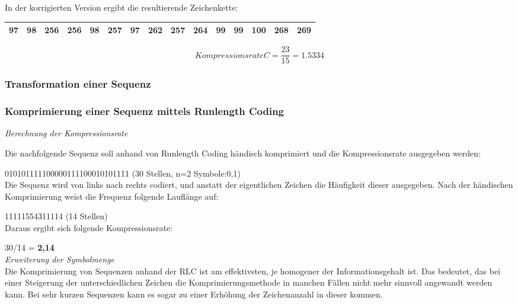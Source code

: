 \documentclass[12pt,german]{article}
\begin{document}
In der korrigierten Version ergibt die resultierende Zeichenkette: 

\begin{table}[H]
  \centering
  \begin{tabular}{| c | c | c | c | c | c | c | c | c | c | c | c | c | c | c |}
    \hline
    97 & 98& 256 & 256 & 98 & 257 & 97 & 262 & 257 & 264 & 99 & 99 & 100 & 268 & 269 \\
    \hline
  \end{tabular}
\end{table}


\begin{equation}[H]
 Kompressionsrate C = \frac{23}{15} = 1.5334	
\end{equation}


\subsubsection{Transformation einer Sequenz}

\subsubsection{Komprimierung einer Sequenz mittels Runlength Coding}
\textit{Berechnung der Kompressionsrate} 

Die nachfolgende Sequenz soll anhand von Runlength Coding händisch komprimiert und die Kompressionsrate ausgegeben werden:

010101111100000111100010101111 (30 Stellen, n=2 Symbole:0,1) \\

Die Sequenz wird von links nach rechts codiert, und anstatt der eigentlichen Zeichen die Häufigkeit dieser ausgegeben. Nach der händischen Komprimierung weist die Frequenz folgende Lauflänge auf:

11111554311114 (14 Stellen)\\


Daraus ergibt sich folgende Kompressionsrate:

30/14 = \textbf{ 2,14}\\

\textit{Erweiterung der Symbolmenge}\\
Die Komprimierung von Sequenzen anhand der RLC ist am effektivsten, je homogener der Informationsgehalt ist. Das bedeutet, das bei einer Steigerung der unterschiedlichen Zeichen die Komprimierungsmethode in manchen Fällen nicht mehr sinnvoll angewandt werden kann. Bei sehr kurzen Sequenzen kann es sogar zu einer Erhöhung der Zeichenanzahl in dieser kommen.\\
\end{document}
